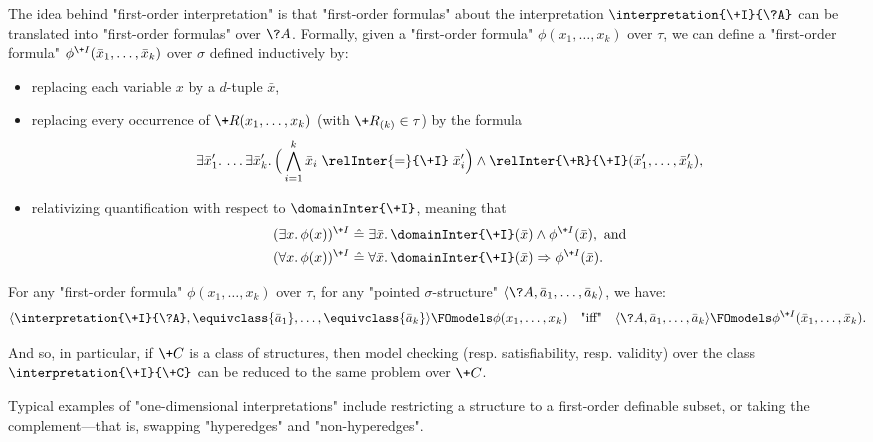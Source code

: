 The idea behind "first-order interpretation" is that
"first-order formulas" about the interpretation $\interpretation{\+I}{\?A}$
can be translated into "first-order formulas" over $\?A$.
Formally, given a "first-order formula" $\phi(x_1,\dotsc,x_k)$ over $\tau$,
we can define a "first-order formula" $\phi^{\+I}(\bar x_1,\dotsc,\bar x_k)$ over $\sigma$
defined inductively by:
\begin{itemize}
	\item replacing each variable $x$ by a $d$-tuple $\bar x$,
	\item replacing every occurrence of
		$\+R(x_1,\dotsc, x_k)$ (with $\+R_{(k)} \in \tau$)
		by the formula
		\[\exists \bar x'_1.\, \dotsc \exists \bar x'_k.\, 
		\Big( \bigwedge_{i=1}^k \bar x_i \mathrel{\relInter{=}{\+I}} \bar x'_i \Big)
		\land \relInter{\+R}{\+I}(\bar x'_1, \dotsc, \bar x'_k),\]
	\item relativizing quantification with respect to $\domainInter{\+I}$,
		meaning that
		\begin{align*}
			(\exists x.\, \phi(x))^{\+I} 
			& \defeq \exists \bar x.\, \domainInter{\+I}(\bar x) \land \phi^{\+I}(\bar x),
			\text{ and} \\ 
			(\forall x.\, \phi(x))^{\+I} 
			& \defeq \forall \bar x.\, \domainInter{\+I}(\bar x) \Rightarrow \phi^{\+I}(\bar x).
		\end{align*}
\end{itemize} 
\begin{proposition}
	\AP\label{prop:first-order-interpretation}
	For any "first-order formula" $\phi(x_1,\dotsc,x_k)$ over $\tau$,
	for any "pointed $\sigma$-structure" $\tup{\?A, \bar a_1,\dotsc, \bar a_k}$, we have:
	\[
		\tup{\interpretation{\+I}{\?A}, \equivclass{\bar a_1}, \dotsc, \equivclass{\bar a_k}}
		\FOmodels \phi(x_1, \dotsc, x_k)
		\quad\text{"iff"}\quad
		\tup{\?A, \bar a_1,\dotsc, \bar a_k} \FOmodels \phi^{\+I}(\bar x_1,\dotsc,\bar x_k).
	\]
\end{proposition}
And so, in particular, if $\+C$ is a class of structures, then
model checking (resp. satisfiability, resp. validity) over the class $\interpretation{\+I}{\+C}$
can be reduced to the same problem over $\+C$.

Typical examples of "one-dimensional interpretations" include
restricting a structure to a first-order definable subset, 
or taking the complement---that is, swapping "hyperedges" and "non-hyperedges".


